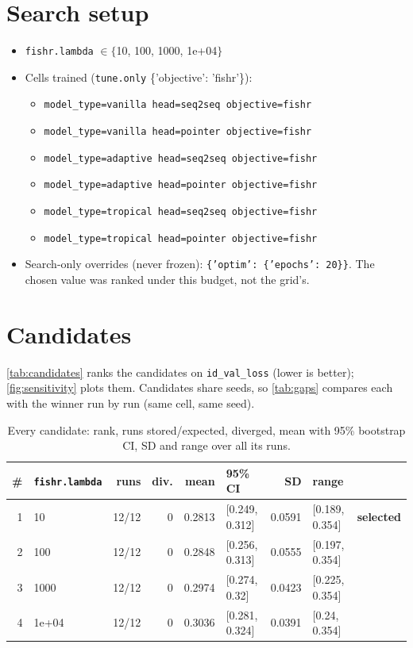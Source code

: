 \documentclass[10pt]{article}
\begin{document}
\section{Search setup}
\begin{itemize}\setlength\itemsep{0pt}
\item \texttt{fishr.lambda} $\in \{$10, 100, 1000, 1e+04$\}$
\item Cells trained (\texttt{tune.only} \{'objective': 'fishr'\}):
\begin{itemize}\setlength\itemsep{0pt}
\item \texttt{model\_type=vanilla head=seq2seq objective=fishr}
\item \texttt{model\_type=vanilla head=pointer objective=fishr}
\item \texttt{model\_type=adaptive head=seq2seq objective=fishr}
\item \texttt{model\_type=adaptive head=pointer objective=fishr}
\item \texttt{model\_type=tropical head=seq2seq objective=fishr}
\item \texttt{model\_type=tropical head=pointer objective=fishr}
\end{itemize}
\item Search-only overrides (never frozen): \texttt{\{'optim': \{'epochs': 20\}\}}. The chosen value was ranked under this budget, not the grid's.
\end{itemize}

\section{Candidates}
\autoref{tab:candidates} ranks the candidates on \texttt{id\_val\_loss} (lower is better); \autoref{fig:sensitivity} plots them.
Candidates share seeds, so \autoref{tab:gaps} compares each with the winner run by run (same cell, same seed).

{\small
\begin{longtable}{rlrrrlrll}
\caption{Every candidate: rank, runs stored/expected, diverged, mean with 95\% bootstrap CI, SD and range over all its runs.}\label{tab:candidates}\\
\toprule
\# & \texttt{fishr.lambda} & runs & div. & mean & 95\% CI & SD & range & \\
\midrule
\endhead
1 & 10 & 12/12 & 0 & 0.2813 & [0.249, 0.312] & 0.0591 & [0.189, 0.354] & \textbf{selected}\\
2 & 100 & 12/12 & 0 & 0.2848 & [0.256, 0.313] & 0.0555 & [0.197, 0.354] & \\
3 & 1000 & 12/12 & 0 & 0.2974 & [0.274, 0.32] & 0.0423 & [0.225, 0.354] & \\
4 & 1e+04 & 12/12 & 0 & 0.3036 & [0.281, 0.324] & 0.0391 & [0.24, 0.354] & \\
\bottomrule
\end{longtable}
}
\end{document}
